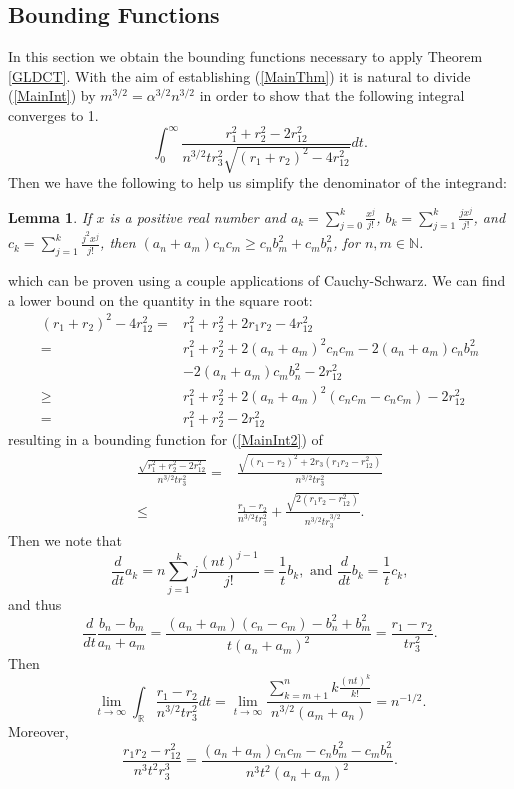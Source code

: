\documentclass[12pt]{amsart}
\newtheorem{lemma}[theorem]{Lemma}
\theoremstyle{remark}
\begin{document}
\subsection{Bounding Functions}
In this section we obtain the bounding functions necessary to apply Theorem \ref{GLDCT}.  With the aim of establishing (\ref{MainThm}) it is natural to divide (\ref{MainInt}) by $m^{3/2}=\alpha^{3/2}n^{3/2}$ in order to show that the following integral converges to 1.
\begin{equation}\label{MainInt2}\int_0^\infty\frac{r_1^2+r_2^2-2r_{12}^2}{n^{3/2}tr_3^2\sqrt{(r_1+r_2)^2-4r_{12}^2}}dt.
\end{equation}
Then we have the following to help us simplify the denominator of the integrand:
\begin{lemma}\label{CSApplication}
If $x$ is a positive real number and $a_k=\sum_{j=0}^k\frac{x^j}{j!}$, $b_k=\sum_{j=1}^k\frac{jx^j}{j!}$, and $c_k=\sum_{j=1}^k\frac{j^2x^j}{j!}$, then $(a_n+a_m)c_nc_m\ge c_nb_m^2+c_mb_n^2$, for $n,m\in\mathbb{N}$.
\end{lemma}
\noindent which can be proven using a couple applications of Cauchy-Schwarz.  We can find a lower bound on the quantity in the square root:
\begin{align*}
(r_1+r_2)^2-4r_{12}^2=&r_1^2+r_2^2+2r_1r_2-4r_{12}^2
\\=&r_1^2+r_2^2+2(a_n+a_m)^2c_nc_m-2(a_n+a_m)c_nb_m^2
\\&-2(a_n+a_m)c_mb_n^2-2r_{12}^2
\\\ge& r_1^2+r_2^2+2(a_n+a_m)^2(c_nc_m-c_nc_m)-2r_{12}^2
\\=&r_1^2+r_2^2-2r_{12}^2
\end{align*}
resulting in a bounding function for (\ref{MainInt2}) of
\begin{align*}\frac{\sqrt{r_1^2+r_2^2-2r_{12}^2}}{n^{3/2}tr_3^2}=&\frac{\sqrt{(r_1-r_2)^2+2r_3(r_1r_2-r_{12}^2)}}{n^{3/2}tr_3^2}
\\\le&\frac{r_1-r_2}{n^{3/2}tr_3^2}+\frac{\sqrt{2(r_1r_2-r_{12}^2)}}{n^{3/2}tr_3^{3/2}}.
\end{align*}
Then we note that
\[\frac{d}{dt}a_k=n\sum_{j=1}^kj\frac{(nt)^{j-1}}{j!}=\frac{1}{t}b_k,\text{ and }\frac{d}{dt}b_k=\frac{1}{t}c_k,\] and thus
\[\frac{d}{dt}\frac{b_n-b_m}{a_n+a_m}=\frac{(a_n+a_m)(c_n-c_m)-b_n^2+b_m^2}{t(a_n+a_m)^2}=\frac{r_1-r_2}{tr_3^2}.\]
Then
\[\lim_{t\to\infty}\int_\mathbb{R}\frac{r_1-r_2}{n^{3/2}tr_3^2}dt=\lim_{t\rightarrow\infty}\frac{\sum_{k=m+1}^nk\frac{(nt)^k}{k!}}{n^{3/2}(a_m+a_n)}=n^{-1/2}.\]
Moreover,
\[\frac{r_1r_2-r_{12}^2}{n^3t^2r_3^3}=\frac{(a_n+a_m)c_nc_m-c_nb_m^2-c_mb_n^2}{n^3t^2(a_n+a_m)^2}.\]
\end{document}
